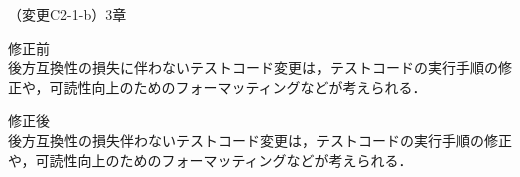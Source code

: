 \documentclass{jarticle} %
\def\subsection#1{ \vspace{1pc} {\gt #1} }
\begin{document}
\subsection{（変更C2-1-b）3章}
\vspace{-0.3cm}
\begin{description}
\item 修正前\\
\phantom{　}
後方互換性の損失に伴わないテストコード変更は，テストコードの実行手順の修正や，可読性向上のためのフォーマッティングなどが考えられる．
\vspace{-0.3cm}
\item 修正後\\
\phantom{　}
後方互換性の損失\textcolor{red}{}伴わないテストコード変更は，テストコードの実行手順の修正や，可読性向上のためのフォーマッティングなどが考えられる．
\end{description}



	
\end{document}
